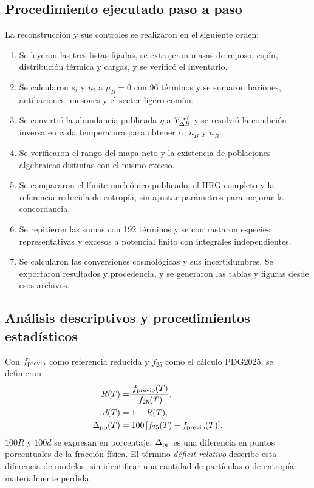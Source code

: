 \subsection{Procedimiento ejecutado paso a paso}
La reconstrucción y sus controles se realizaron en el siguiente orden:
\begin{enumerate}
\setlength{\itemsep}{2pt}
\item Se leyeron las tres listas fijadas, se extrajeron masas de reposo, espín, distribución térmica y cargas, y se verificó el inventario.
\item Se calcularon $s_i$ y $n_i$ a $\mu_B=0$ con 96 términos y se sumaron bariones, antibariones, mesones y el sector ligero común.
\item Se convirtió la abundancia publicada $\eta$ a $Y_{\Delta B}^{\rm ref}$ y se resolvió la condición inversa en cada temperatura para obtener $\alpha$, $n_B$ y $n_{\bar B}$.
\item Se verificaron el rango del mapa neto y la existencia de poblaciones algebraicas distintas con el mismo exceso.
\item Se compararon el límite nucleónico publicado, el HRG completo y la referencia reducida de entropía, sin ajustar parámetros para mejorar la concordancia.
\item Se repitieron las sumas con 192 términos y se contrastaron especies representativas y excesos a potencial finito con integrales independientes.
\item Se calcularon las conversiones cosmológicas y sus incertidumbres. Se exportaron resultados y procedencia, y se generaron las tablas y figuras desde esos archivos.
\end{enumerate}

\subsection{Análisis descriptivos y procedimientos estadísticos}
Con $f_{\rm previo}$ como referencia reducida y $f_{25}$ como el cálculo PDG2025, se definieron
\begin{align}
R(T)&=\frac{f_{\rm previo}(T)}{f_{25}(T)},\\
d(T)&=1-R(T),\\
\Delta_{\rm pp}(T)&=100\,[f_{25}(T)-f_{\rm previo}(T)].
\end{align}
$100R$ y $100d$ se expresan en porcentaje; $\Delta_{\rm pp}$ es una diferencia en puntos porcentuales de la fracción física. El término \emph{déficit relativo} describe esta diferencia de modelos, sin identificar una cantidad de partículas o de entropía materialmente perdida.


